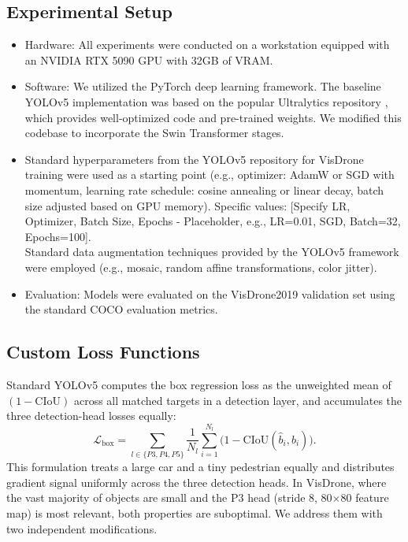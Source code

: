 \documentclass[conference]{IEEEtran}
\begin{document}
\subsection{Experimental Setup}
\begin{itemize}
    \item Hardware: All experiments were conducted on a workstation equipped with an NVIDIA RTX 5090 GPU with 32GB of VRAM.
    \item Software: We utilized the PyTorch deep learning framework. The baseline YOLOv5 implementation was based on the popular Ultralytics repository \cite{yolov5}, which provides well-optimized code and pre-trained weights. We modified this codebase to incorporate the Swin Transformer stages.
    \item Standard hyperparameters from the YOLOv5 repository for VisDrone training were used as a starting point (e.g., optimizer: AdamW or SGD with momentum, learning rate schedule: cosine annealing or linear decay, batch size adjusted based on GPU memory). Specific values: [Specify LR, Optimizer, Batch Size, Epochs - Placeholder, e.g., LR=0.01, SGD, Batch=32, Epochs=100]. \\
Standard data augmentation techniques provided by the YOLOv5 framework were employed (e.g., mosaic, random affine transformations, color jitter).

    \item Evaluation: Models were evaluated on the VisDrone2019 validation set using the standard COCO evaluation metrics.
\end{itemize}

\subsection{Custom Loss Functions}
\label{sec:loss}

Standard YOLOv5 computes the box regression loss as the unweighted mean of
$(1 - \text{CIoU})$ across all matched targets in a detection layer, and
accumulates the three detection-head losses equally:
%
\begin{equation}
  \mathcal{L}_{\text{box}} = \sum_{l \in \{P3,P4,P5\}}
    \frac{1}{N_l}\sum_{i=1}^{N_l}\bigl(1 - \text{CIoU}(\hat{b}_i, b_i)\bigr).
  \label{eq:original}
\end{equation}
%
This formulation treats a large car and a tiny pedestrian equally and
distributes gradient signal uniformly across the three detection heads.  In
VisDrone, where the vast majority of objects are small and the P3 head
(stride 8, 80$\times$80 feature map) is most relevant, both properties are
suboptimal.  We address them with two independent modifications.
\end{document}
